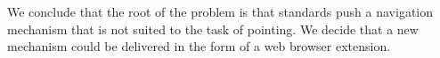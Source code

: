 \documentclass[11pt,openright,a4paper]{report}
\begin{document}
We conclude that the root of the problem is that standards push a navigation mechanism that is not suited to the task of pointing. We decide that a new mechanism could be delivered in the form of a web browser extension.

\end{document}
